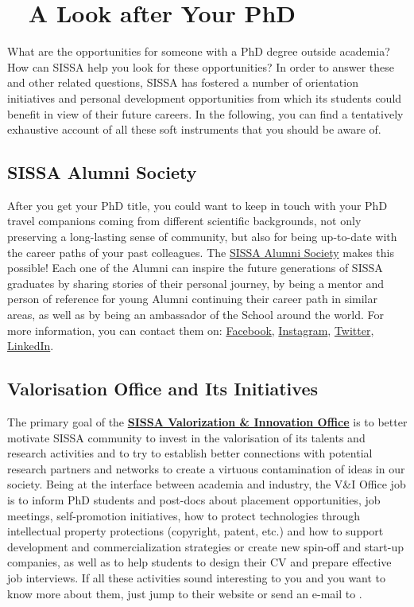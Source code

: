 \documentclass{sissavademecum}
\begin{document}
\chapter{\texorpdfstring{\faCogs\ }{} A Look after Your PhD}

What are the opportunities for someone with a PhD degree outside academia? How can SISSA help you look for these opportunities? In order to answer these and other related questions, SISSA has fostered a number of orientation initiatives and personal development opportunities from which its students could benefit in view of their future careers. In the following, you can find a tentatively exhaustive account of all these soft instruments that you should be aware of.


\section{SISSA Alumni Society}

After you get your PhD title, you could want to keep in touch with your PhD travel companions coming from different scientific backgrounds, not only preserving a long-lasting sense of community, but also for being up-to-date with the career paths of your past colleagues. The \href{https://alumni.sissa.it}{SISSA Alumni Society} makes this possible! Each one of the Alumni can inspire the future generations of SISSA graduates by sharing stories of their personal journey, by being a mentor and person of reference for young Alumni continuing their career path in similar areas, as well as by being an ambassador of the School around the world. 
For more information, you can contact them on: \href{https://www.facebook.com/SISSAAlumniSociety/}{Facebook}, \href{https://www.instagram.com/sissaalumni/}{Instagram}, \href{https://twitter.com/AlumniSissa}{Twitter}, \href{https://www.linkedin.com/groups/1761097/}{LinkedIn}.


\section{Valorisation Office and Its Initiatives}

The primary goal of the \href{https://www.valorisation.sissa.it/}{\textbf{SISSA Valorization \& Innovation Office}} is to better motivate SISSA community to invest in the valorisation of its talents and research activities and to try to establish better connections with potential research partners and networks to create a virtuous contamination of ideas in our society. Being at the interface between academia and industry, the V\&I Office job is to inform PhD students and post-docs about placement opportunities, job meetings, self-promotion initiatives, how to protect technologies through intellectual property protections (copyright, patent, etc.) and how to support development and commercialization strategies or create new spin-off and start-up companies, as well as to help students to design their CV and prepare effective job interviews. If all these activities sound interesting to you and you want to know more about them, just jump to their website or send an e-mail to .
\end{document}
